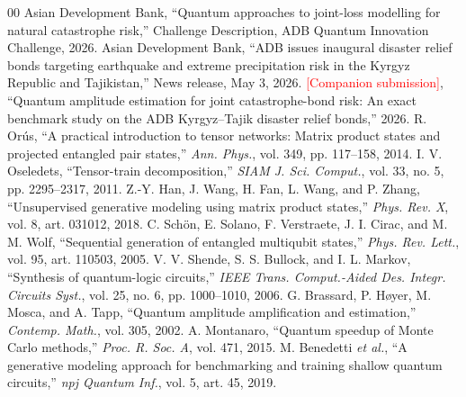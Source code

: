 \documentclass[conference]{IEEEtran}
\newcommand{\todo}[1]{\textcolor{red}{[#1]}}
\begin{document}
\begin{thebibliography}{00}
 Asian Development Bank, ``Quantum approaches to joint-loss modelling for natural catastrophe risk,'' Challenge Description, ADB Quantum Innovation Challenge, 2026.
 Asian Development Bank, ``ADB issues inaugural disaster relief bonds targeting earthquake and extreme precipitation risk in the Kyrgyz Republic and Tajikistan,'' News release, May 3, 2026.
 \todo{Companion submission}, ``Quantum amplitude estimation for joint catastrophe-bond risk: An exact benchmark study on the ADB Kyrgyz--Tajik disaster relief bonds,'' 2026.
 R. Or\'us, ``A practical introduction to tensor networks: Matrix product states and projected entangled pair states,'' \emph{Ann. Phys.}, vol. 349, pp. 117--158, 2014.
 I. V. Oseledets, ``Tensor-train decomposition,'' \emph{SIAM J. Sci. Comput.}, vol. 33, no. 5, pp. 2295--2317, 2011.
 Z.-Y. Han, J. Wang, H. Fan, L. Wang, and P. Zhang, ``Unsupervised generative modeling using matrix product states,'' \emph{Phys. Rev. X}, vol. 8, art. 031012, 2018.
 C. Sch\"on, E. Solano, F. Verstraete, J. I. Cirac, and M. M. Wolf, ``Sequential generation of entangled multiqubit states,'' \emph{Phys. Rev. Lett.}, vol. 95, art. 110503, 2005.
 V. V. Shende, S. S. Bullock, and I. L. Markov, ``Synthesis of quantum-logic circuits,'' \emph{IEEE Trans. Comput.-Aided Des. Integr. Circuits Syst.}, vol. 25, no. 6, pp. 1000--1010, 2006.
 G. Brassard, P. H{\o}yer, M. Mosca, and A. Tapp, ``Quantum amplitude amplification and estimation,'' \emph{Contemp. Math.}, vol. 305, 2002.
 A. Montanaro, ``Quantum speedup of Monte Carlo methods,'' \emph{Proc. R. Soc. A}, vol. 471, 2015.
 M. Benedetti \emph{et al.}, ``A generative modeling approach for benchmarking and training shallow quantum circuits,'' \emph{npj Quantum Inf.}, vol. 5, art. 45, 2019.
\end{thebibliography}
\end{document}

